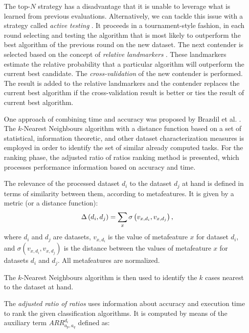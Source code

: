 The top-$N$ strategy has a disadvantage that it is unable to leverage what is learned from previous evaluations.
Alternatively, we can tackle this issue with a strategy called \emph{active testing} \cite{activeTesting}. It proceeds in a tournament-style fashion, in each round selecting and testing the algorithm that is most likely to outperform the best algorithm of the previous round on the new dataset. The next contender is selected based on the concept of \emph{relative landmarkers} \cite{relativeLandmarkers}. These landmarkers estimate the relative probability that a particular algorithm will outperform the current best candidate. The \emph{cross-validation} \cite{aima3ed} of the new contender is performed. The result is added to the relative landmarkers and the contender replaces the current best algorithm if the cross-validation result is better or ties the result of current best algorithm.

One approach of combining time and accuracy was proposed by Brazdil et al. \cite{Brazdil00zoomedranking}. The $k$-Nearest Neighbours algorithm \cite{knn} with a distance function based on a set of statistical, information theoretic, and other dataset characterization measures is employed in order to identify the set of similar already computed tasks. For the ranking phase, the adjusted ratio of ratios ranking method is presented, which processes performance information based on accuracy and time.

The relevance of the processed dataset $d_i$ to the dataset $d_j$ at hand is defined in terms of similarity between them, according to metafeatures. It is given by a metric (or a distance function):
\begin{equation}
\Delta\left(d_i,d_j\right)=\sum_{x} \sigma\left(v_{x,d_i},v_{x,d_j} \right),
\end{equation}
where $d_{i}$ and $d_j$ are datasets, $v_{x,d_i}$ is the value of metafeature $x$ for dataset $d_i$, and $\sigma\left(v_{x,d_i},v_{x,d_j} \right)$ is the distance between the values of metafeature $x$ for datasets $d_{i}$ and $d_j$. All metafeatures are normalized.

The $k$-Nearest Neighbours algorithm is then used to identify the $k$ cases nearest to the dataset at hand.

The \emph{adjusted ratio of ratios} uses information about accuracy and execution time to rank the given classification algorithms. It is computed by means of the auxiliary term ${ARR}_{a_p,a_q}^{d_i}$ defined as:

